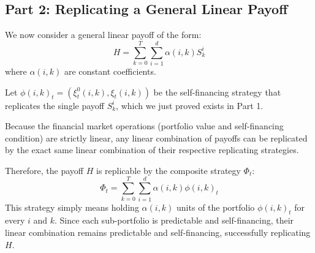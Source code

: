 \subsection{Part 2: Replicating a General Linear Payoff}

We now consider a general linear payoff of the form:
\begin{equation}
    H = \sum_{k=0}^T \sum_{i=1}^d \alpha(i,k) S_k^i
\end{equation}
where $\alpha(i,k)$ are constant coefficients.

Let $\phi(i,k)_t = (\xi_t^0(i,k), \xi_t(i,k))$ be the self-financing strategy that replicates the single payoff $S_k^i$, which we just proved exists in Part 1.

Because the financial market operations (portfolio value and self-financing condition) are strictly linear, any linear combination of payoffs can be replicated by the exact same linear combination of their respective replicating strategies.

Therefore, the payoff $H$ is replicable by the composite strategy $\Phi_t$:
\begin{equation}
    \Phi_t = \sum_{k=0}^T \sum_{i=1}^d \alpha(i,k) \phi(i,k)_t
\end{equation}
This strategy simply means holding $\alpha(i,k)$ units of the portfolio $\phi(i,k)_t$ for every $i$ and $k$. Since each sub-portfolio is predictable and self-financing, their linear combination remains predictable and self-financing, successfully replicating $H$.